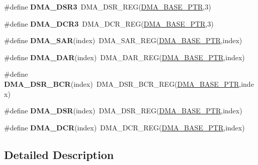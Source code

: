 \begin{DoxyCompactItemize}
\#define {\bfseries D\+M\+A\+\_\+\+D\+S\+R3}~D\+M\+A\+\_\+\+D\+S\+R\+\_\+\+R\+EG(\hyperlink{group___d_m_a___peripheral_ga6997fbc1b1973e9f27170217a3bd6f22}{D\+M\+A\+\_\+\+B\+A\+S\+E\+\_\+\+P\+TR},3)
\item 
\mbox{\label{group___d_m_a___register___accessor___macros_gaef70919394fc3fee281761ed689c7d05}} 
\#define {\bfseries D\+M\+A\+\_\+\+D\+C\+R3}~D\+M\+A\+\_\+\+D\+C\+R\+\_\+\+R\+EG(\hyperlink{group___d_m_a___peripheral_ga6997fbc1b1973e9f27170217a3bd6f22}{D\+M\+A\+\_\+\+B\+A\+S\+E\+\_\+\+P\+TR},3)
\item 
\mbox{\label{group___d_m_a___register___accessor___macros_ga57b576acd2e1fe48b4de69b3744f5c31}} 
\#define {\bfseries D\+M\+A\+\_\+\+S\+AR}(index)~D\+M\+A\+\_\+\+S\+A\+R\+\_\+\+R\+EG(\hyperlink{group___d_m_a___peripheral_ga6997fbc1b1973e9f27170217a3bd6f22}{D\+M\+A\+\_\+\+B\+A\+S\+E\+\_\+\+P\+TR},index)
\item 
\mbox{\label{group___d_m_a___register___accessor___macros_ga12c5436caa647bcc151869ce8dd11ae9}} 
\#define {\bfseries D\+M\+A\+\_\+\+D\+AR}(index)~D\+M\+A\+\_\+\+D\+A\+R\+\_\+\+R\+EG(\hyperlink{group___d_m_a___peripheral_ga6997fbc1b1973e9f27170217a3bd6f22}{D\+M\+A\+\_\+\+B\+A\+S\+E\+\_\+\+P\+TR},index)
\item 
\mbox{\label{group___d_m_a___register___accessor___macros_ga2e7c37909967bf1dbef49c5dd36a4630}} 
\#define {\bfseries D\+M\+A\+\_\+\+D\+S\+R\+\_\+\+B\+CR}(index)~D\+M\+A\+\_\+\+D\+S\+R\+\_\+\+B\+C\+R\+\_\+\+R\+EG(\hyperlink{group___d_m_a___peripheral_ga6997fbc1b1973e9f27170217a3bd6f22}{D\+M\+A\+\_\+\+B\+A\+S\+E\+\_\+\+P\+TR},index)
\item 
\mbox{\label{group___d_m_a___register___accessor___macros_ga1d8dce59fe1bc14c72aae4eb53e8242e}} 
\#define {\bfseries D\+M\+A\+\_\+\+D\+SR}(index)~D\+M\+A\+\_\+\+D\+S\+R\+\_\+\+R\+EG(\hyperlink{group___d_m_a___peripheral_ga6997fbc1b1973e9f27170217a3bd6f22}{D\+M\+A\+\_\+\+B\+A\+S\+E\+\_\+\+P\+TR},index)
\item 
\mbox{\label{group___d_m_a___register___accessor___macros_ga4b180d4e51dbf0b420d8ddb03cd2fa48}} 
\#define {\bfseries D\+M\+A\+\_\+\+D\+CR}(index)~D\+M\+A\+\_\+\+D\+C\+R\+\_\+\+R\+EG(\hyperlink{group___d_m_a___peripheral_ga6997fbc1b1973e9f27170217a3bd6f22}{D\+M\+A\+\_\+\+B\+A\+S\+E\+\_\+\+P\+TR},index)
\end{DoxyCompactItemize}


\subsection{Detailed Description}
